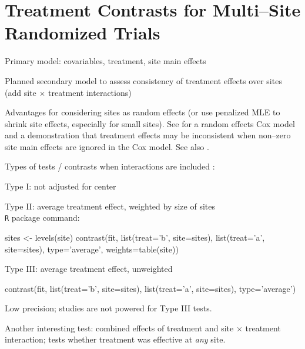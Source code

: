 \section{Treatment Contrasts for Multi--Site Randomized
  Trials}
\bi
\item   Primary model: covariables, treatment, site main effects
\item   Planned secondary model to assess consistency of treatment
        effects over sites (add site $\times$ treatment interactions)
\item   Advantages for considering sites as random effects (or use
        penalized MLE to shrink site effects, especially for small sites).
        See \cite{and99tes} for a random effects Cox model and a
        demonstration that treatment effects may be inconsistent when
        non--zero site main effects are ignored in the Cox model.  See
        also \cite{yam99inv}.
\item   Types of tests / contrasts when interactions are included \ipacue
  \cite{sch00gen}:
    \bi
    \item   Type I: not adjusted for center
    \item   Type II: average treatment effect, weighted by size of
            sites \\
    \texttt{R}  package command:
\begin{Schunk}
\begin{Sinput}
sites <- levels(site)
contrast(fit, list(treat='b', site=sites),
              list(treat='a', site=sites),
         type='average', weights=table(site))
\end{Sinput}
\end{Schunk}
    \item   Type III: average treatment effect, unweighted \\
\begin{Schunk}
\begin{Sinput}
contrast(fit, list(treat='b', site=sites),
              list(treat='a', site=sites), type='average')
\end{Sinput}
\end{Schunk}
    Low precision; studies are not powered for Type III tests.
    \ei

\item   Another interesting test: combined effects of treatment and
        site $\times$ treatment interaction; tests whether treatment
        was effective at {\em any} site.
\ei

